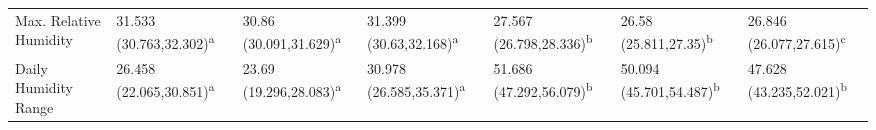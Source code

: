 \documentclass[doublespacing, linenumbers]{bmcart}
\begin{document}
\begin{backmatter}
\begin{sidewaystable}[h!]
{\begin{tabular}{l|lll|lll}
Max. Relative Humidity  & 31.533 (30.763,32.302)\textsuperscript{a}  & 30.86 (30.091,31.629)\textsuperscript{a}  & 31.399 (30.63,32.168)\textsuperscript{a}  & 27.567 (26.798,28.336)\textsuperscript{b} & 26.58 (25.811,27.35)\textsuperscript{b}    & 26.846 (26.077,27.615)\textsuperscript{c} \\
Daily Humidity Range    & 26.458 (22.065,30.851)\textsuperscript{a}  & 23.69 (19.296,28.083)\textsuperscript{a}  & 30.978 (26.585,35.371)\textsuperscript{a} & 51.686 (47.292,56.079)\textsuperscript{b} & 50.094 (45.701,54.487)\textsuperscript{b}  & 47.628 (43.235,52.021)\textsuperscript{b}
\end{tabular}}
  \label{table:climate}
\end{sidewaystable}

\begin{table}[h!]


\end{table}
\end{backmatter}
\end{document}
